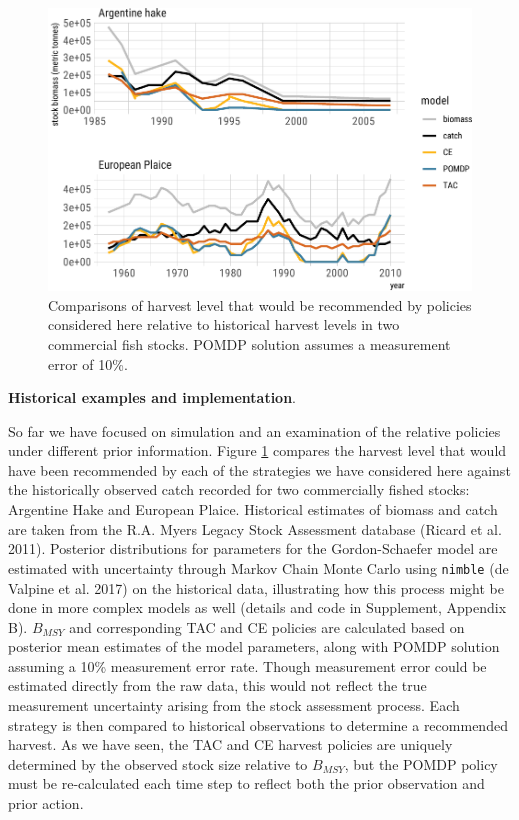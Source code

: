 \documentclass[3p]{elsarticle} %
\makeatletter
\def\maxwidth{\ifdim\Gin@nat@width>\linewidth\linewidth
\else\Gin@nat@width\fi}
\let\Oldincludegraphics\includegraphics
\renewcommand{\includegraphics}[1]{\Oldincludegraphics[width=\maxwidth]{#1}}
\makeatother
\begin{document}
\begin{figure}
\centering
\includegraphics{manuscript_files/figure-latex/historical-1.pdf}
\caption{Comparisons of harvest level that would be recommended by
policies considered here relative to historical harvest levels in two
commercial fish stocks. POMDP solution assumes a measurement error of
10\%. \label{historical}}
\end{figure}

\textbf{Historical examples and implementation}.

So far we have focused on simulation and an examination of the relative
policies under different prior information. Figure \ref{historical}
compares the harvest level that would have been recommended by each of
the strategies we have considered here against the historically observed
catch recorded for two commercially fished stocks: Argentine Hake and
European Plaice. Historical estimates of biomass and catch are taken
from the R.A. Myers Legacy Stock Assessment database (Ricard et al.
2011). Posterior distributions for parameters for the Gordon-Schaefer
model are estimated with uncertainty through Markov Chain Monte Carlo
using \texttt{nimble} (de Valpine et al. 2017) on the historical data,
illustrating how this process might be done in more complex models as
well (details and code in Supplement, Appendix B). \(B_{MSY}\) and
corresponding TAC and CE policies are calculated based on posterior mean
estimates of the model parameters, along with POMDP solution assuming a
10\% measurement error rate. Though measurement error could be estimated
directly from the raw data, this would not reflect the true measurement
uncertainty arising from the stock assessment process. Each strategy is
then compared to historical observations to determine a recommended
harvest. As we have seen, the TAC and CE harvest policies are uniquely
determined by the observed stock size relative to \(B_{MSY}\), but the
POMDP policy must be re-calculated each time step to reflect both the
prior observation and prior action.
\end{document}
